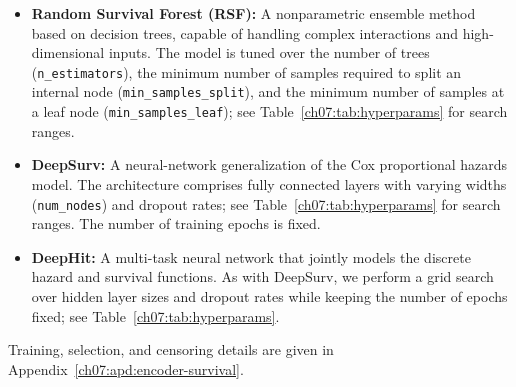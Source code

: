 \begin{itemize}
    \item \textbf{Random Survival Forest (RSF):}
    A nonparametric ensemble method based on decision trees, capable of handling complex interactions and high-dimensional inputs.
    The model is tuned over the number of trees (\texttt{n\_estimators}), the minimum number of samples required to split an internal node (\texttt{min\_samples\_split}), and the minimum number of samples at a leaf node (\texttt{min\_samples\_leaf}); see Table~\ref{ch07:tab:hyperparams} for search ranges.

    \item \textbf{DeepSurv:}
    A neural-network generalization of the Cox proportional hazards model.
    The architecture comprises fully connected layers with varying widths (\texttt{num\_nodes}) and dropout rates; see Table~\ref{ch07:tab:hyperparams} for search ranges.
The number of training epochs is fixed.

    \item \textbf{DeepHit:}
    A multi-task neural network that jointly models the discrete hazard and survival functions.
    As with DeepSurv, we perform a grid search over hidden layer sizes and dropout rates while keeping the number of epochs fixed; see Table~\ref{ch07:tab:hyperparams}.
\end{itemize}

Training, selection, and censoring details are given in Appendix~\ref{ch07:apd:encoder-survival}.
\par
